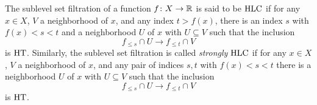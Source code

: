 


%

\begin{defi} \label{defi:local_connectedness_filtrations}
	The sublevel set filtration of a function $f \colon X \to \mathbb{R}$ is said to be $\mathrm{HLC}$ 
	if for any $x \in X$, $V$ a neighborhood of $x$, and any index $t > f(x)$, there is an index $s$ with  $f(x) < s < t$ and a neighborhood $U$ of $x$ with $U \subseteq V$ such that the inclusion
	\begin{equation*}
	f_{\leq s} \cap U \to f_{\leq t} \cap V
	\end{equation*}
	is $\mathrm{HT}$.
	Similarly, the sublevel set filtration is called \emph{strongly $\mathrm{HLC}$} if for any $x \in X$, $V$ a neighborhood of $x$, and any pair of indices $s,t$ with $f(x) < s < t$ there is a neighborhood $U$ of $x$ with $U \subseteq V$ such that the inclusion
	\begin{equation*}
	f_{\leq s} \cap U \to f_{\leq t} \cap V
	\end{equation*}
	is $\mathrm{HT}$.
\end{defi}

